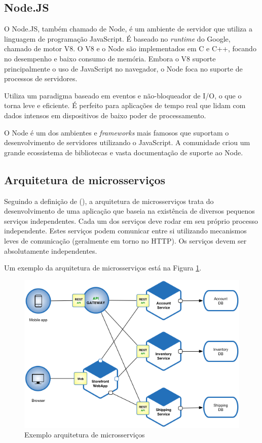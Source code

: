 \subsection{Node.JS}

O Node.JS, também chamado de Node, é um ambiente de servidor que utiliza a linguagem de programação JavaScript. É baseado no \textit{runtime} do Google, chamado de motor V8. O V8 e o Node são implementados em C e C++, focando no desempenho e baixo consumo de memória. Embora o V8 suporte principalmente o uso de JavaScript no navegador, o Node foca no suporte de processos de servidores. \cite{Tilkov2010}

Utiliza um paradigma baseado em eventos e não-bloqueador de I/O, o que o torna leve e eficiente. É perfeito para aplicações de tempo real que lidam com dados intensos em dispositivos de baixo poder de processamento. \cite{Sapes2016}

O Node é um dos ambientes e \textit{frameworks} mais famosos que suportam o desenvolvimento de servidores utilizando o JavaScript. A comunidade criou um grande ecossistema de bibliotecas e vasta documentação de suporte ao Node. \cite{Tilkov2010}

\subsection{Arquitetura de microsserviços}

Seguindo a definição de \citeauthor{ms1} (\citeyear{ms1}), a arquitetura de microsserviços trata do desenvolvimento de uma aplicação que baseia na existência de diversos pequenos serviços independentes. Cada um dos serviços deve rodar em seu próprio processo independente. Estes serviços podem comunicar entre si utilizando mecanismos leves de comunicação (geralmente em torno no HTTP). Os serviços devem ser absolutamente independentes.

Um exemplo da arquitetura de microsserviços está na Figura \ref{fig:arquitetura-microsservicos}.

\begin{figure}[htbp]
	\centering
	\includegraphics[width=1\linewidth]{figuras/Microservice_Architecture.png}
	\caption{Exemplo arquitetura de microsserviços}
	\label{fig:arquitetura-microsservicos}
\end{figure}

